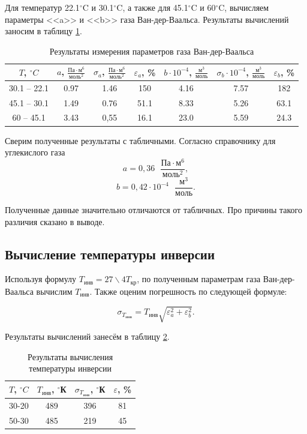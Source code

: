 \documentclass[a4paper,12pt]{article}
\theoremstyle{definition}
\begin{document}
	Для температур 22.1$ ^\circ $C и 30.1$ ^\circ $C, а также для 45.1$ ^\circ $C и 60$ ^\circ $C, вычисляем параметры <<a>> и <<b>> газа Ван-дер-Ваальса. Результаты вычислений заносим в таблицу \ref{tab:a-b}.
	
	\begin{table}[H]
		\centering
		\begin{tabular}{|c|c|c|c|c|c|c|}
			\hline
			$ T $, $ ^\circ C $ & $ a $, $\displaystyle \frac{\text{Па}\cdot\text{м}^6}{\text{моль}^2} $ &$ \sigma_a $, $\displaystyle \frac{\text{Па}\cdot\text{м}^6}{\text{моль}^2} $ & $ \varepsilon_a $, \% & $ b\cdot10^{-4} $, $ \displaystyle\frac{\text{м}^3}{\text{моль}} $ & $ \sigma_b \cdot 10^{-4} $, $\displaystyle \frac{\text{м}^3}{\text{моль}} $ & $ \varepsilon_b $, \% \\ \hline
			30.1 -- 22.1 & 0.97 & 1.46 & 150 & 4.16 & 7.57 & 182 \\ \hline
			45.1 -- 30.1 & 1.49 & 0.76 & 51.1 & 8.33 & 5.26 & 63.1 \\ \hline
			60 -- 45.1 & 3.43 & 0,55 & 16.1 & 23.0 & 5.59 & 24.3 \\ \hline
		\end{tabular}
		\caption{Результаты измерения параметров газа Ван-дер-Ваальса}
		\label{tab:a-b}
	\end{table}
	
	Сверим полученные результаты с табличными. Согласно справочнику для углекислого газа \[ a = 0,36 \text{ } \frac{\text{Па}\cdot\text{м}^6}{\text{моль}^2}, \] \[ b = 0,42\cdot 10^{-4} \text{ }\frac{\text{м}^3}{\text{моль}}. \]
	
	Полученные данные значительно отличаются от табличных. Про причины такого различия сказано в выводе.
	
	\subsection{Вычисление температуры инверсии}
	
	Используя формулу $T_\text{инв} = 27\backslash4T_\text{кр}$, по полученным параметрам газа Ван-дер-Ваальса вычислим $ T_\text{инв} $. Также оценим погрешность по следующей формуле:
	
	\[ \sigma_{T_\text{инв}} = T_\text{инв}\sqrt{\varepsilon^2_a+\varepsilon_b^2}. \]
	
	Результаты вычислений занесём в таблицу \ref{tab:temp}.
	
	\begin{table}[H]
		\centering
		\begin{tabular}{|c|c|c|c|}
			\hline
			$ T $, $ ^\circ C $ & $ T_\text{инв} $, $ ^\circ $К & $ \sigma_{T_\text{инв}} $, $ ^\circ $К & $ \varepsilon $, \% \\ \hline
			30-20 & 489 & 396 & 81 \\ \hline
			50-30 & 485 & 219 & 45 \\ \hline
		\end{tabular}
		\caption{Результаты вычисления температуры инверсии}
		\label{tab:temp}
	\end{table}
	
\end{document}
